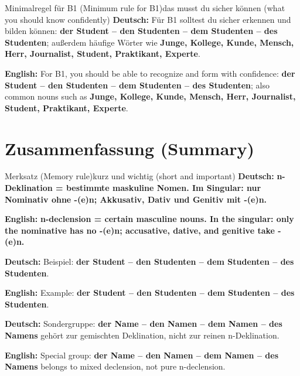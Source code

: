 \documentclass[a4paper,11pt]{article}
\newcommand{\GermanText}[1]{\textbf{Deutsch: }#1\par}
\newcommand{\EnglishText}[1]{{\small\color{SoftGray}\textbf{English: }#1\par}}
\begin{document}
        \begin{grammarentry}{Minimalregel für B1 \textnormal{(Minimum rule for B1)}}{das musst du sicher können \textnormal{(what you should know confidently)}}
            \GermanText{Für B1 solltest du sicher erkennen und bilden können: \textbf{der Student -- den Studenten -- dem Studenten -- des Studenten}; außerdem häufige Wörter wie \textbf{Junge, Kollege, Kunde, Mensch, Herr, Journalist, Student, Praktikant, Experte}.}
            \EnglishText{For B1, you should be able to recognize and form with confidence: \textbf{der Student -- den Studenten -- dem Studenten -- des Studenten}; also common nouns such as \textbf{Junge, Kollege, Kunde, Mensch, Herr, Journalist, Student, Praktikant, Experte}.}
        \end{grammarentry}

    \section{Zusammenfassung \textnormal{(Summary)}}

        \begin{grammarentry}{Merksatz \textnormal{(Memory rule)}}{kurz und wichtig \textnormal{(short and important)}}
            \GermanText{\textbf{n-Deklination = bestimmte maskuline Nomen. Im Singular: nur Nominativ ohne -(e)n; Akkusativ, Dativ und Genitiv mit -(e)n.}}
            \EnglishText{\textbf{n-declension = certain masculine nouns. In the singular: only the nominative has no -(e)n; accusative, dative, and genitive take -(e)n.}}

            \GermanText{Beispiel: \textbf{der Student -- den Studenten -- dem Studenten -- des Studenten}.}
            \EnglishText{Example: \textbf{der Student -- den Studenten -- dem Studenten -- des Studenten}.}

            \GermanText{Sondergruppe: \textbf{der Name -- den Namen -- dem Namen -- des Namens} gehört zur gemischten Deklination, nicht zur reinen n-Deklination.}
            \EnglishText{Special group: \textbf{der Name -- den Namen -- dem Namen -- des Namens} belongs to mixed declension, not pure n-declension.}
        \end{grammarentry}
\end{document}
